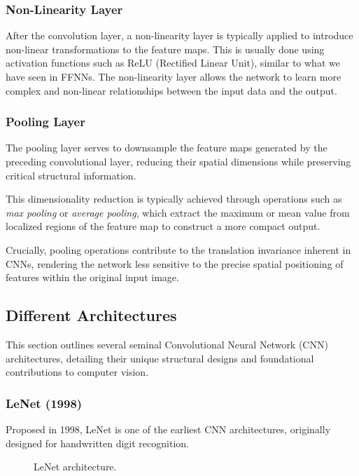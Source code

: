 \subsubsection{Non-Linearity Layer}
After the convolution layer, a non-linearity layer is typically applied to introduce non-linear transformations to the feature maps.
This is usually done using activation functions such as ReLU (Rectified Linear Unit), similar to what we have seen in FFNNs.
The non-linearity layer allows the network to learn more complex and non-linear relationships between the input data and the output.

\subsubsection{Pooling Layer} 
The pooling layer serves to downsample the feature maps generated by the preceding convolutional layer, reducing their spatial dimensions while preserving critical structural information. 

This dimensionality reduction is typically achieved through operations such as \textit{max pooling} or \textit{average pooling}, which extract the maximum or mean value from localized regions of the feature map to construct a more compact output. 

Crucially, pooling operations contribute to the translation invariance inherent in CNNs, rendering the network less sensitive to the precise spatial positioning of features within the original input image.

\subsection{Different Architectures}

This section outlines several seminal Convolutional Neural Network (CNN) architectures, detailing their unique structural designs and foundational contributions to computer vision.

\subsubsection{LeNet (1998)}
Proposed in 1998, LeNet is one of the earliest CNN architectures, originally designed for handwritten digit recognition.

\begin{figure}[H]
    \centering
    
    \caption{LeNet architecture.}
    \label{fig:LeNet}
\end{figure}

